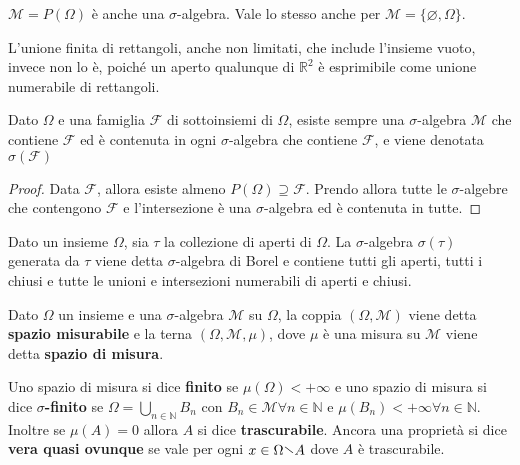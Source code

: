 \begin{example}
    \(\mathcal{M} = P(\Omega)\) è anche una \(\sigma\)-algebra. Vale lo stesso
    anche per \(\mathcal{M} = \{\varnothing, \Omega\} \).
\end{example}
\begin{example}
    L'unione finita di rettangoli, anche non limitati, che include l'insieme
    vuoto, invece non lo è, poiché un aperto qualunque di \(\mathbb{R}^{2}\) è
    esprimibile come unione numerabile di rettangoli.
\end{example}

\newpage
\begin{theorem}

Dato \(\Omega\) e una famiglia \(\mathcal{F}\) di sottoinsiemi di \(\Omega\),
esiste sempre una \(\sigma\)-algebra \(\mathcal{M}\) che contiene
\(\mathcal{F}\) ed è contenuta in ogni \(\sigma\)-algebra che contiene
\(\mathcal{F}\), e viene denotata \(\sigma(\mathcal{F})\)

\end{theorem}

\begin{proof}
    Data \(\mathcal{F}\), allora esiste almeno \(P(\Omega) \supseteq \mathcal{F}
    \). Prendo allora tutte le \(\sigma\)-algebre che contengono \(\mathcal{F}\)
    e l'intersezione è una \(\sigma\)-algebra ed è contenuta in tutte.
\end{proof}

\begin{example}
    Dato un insieme \(\Omega\), sia \(\tau\) la collezione di aperti di
    \(\Omega\). La \(\sigma\)-algebra \(\sigma(\tau)\) generata da \(\tau\)
    viene detta \(\sigma\)-algebra di Borel e contiene tutti gli aperti, tutti i
    chiusi e tutte le unioni e intersezioni numerabili di aperti e chiusi.
\end{example}

    Dato \(\Omega\) un insieme e una \(\sigma\)-algebra \(\mathcal{M}\) su
    \(\Omega\), la coppia \((\Omega, \mathcal{M})\) viene detta \textbf{spazio
    misurabile} e la terna \((\Omega, \mathcal{M}, \mu)\), dove \(\mu\) è una
    misura su \(\mathcal{M}\) viene detta \textbf{spazio di misura}.

    Uno spazio di misura si dice \textbf{finito} se \(\mu(\Omega) < +\infty\) e
    uno spazio di misura si dice \textbf{\(\sigma\)-finito} se \(\Omega =
    \bigcup_{n \in \mathbb{N}} B_{n} \) con \(B_{n} \in \mathcal{M} \forall n
    \in \mathbb{N}\) e \(\mu(B_{n}) < +\infty \forall n \in \mathbb{N}\).
    Inoltre se \(\mu(A) = 0\) allora \(A\) si dice \textbf{trascurabile}. Ancora
    una proprietà si dice \textbf{vera quasi ovunque} se vale per ogni \(x \in
    \Omega \sminus A\) dove \(A\) è trascurabile.

